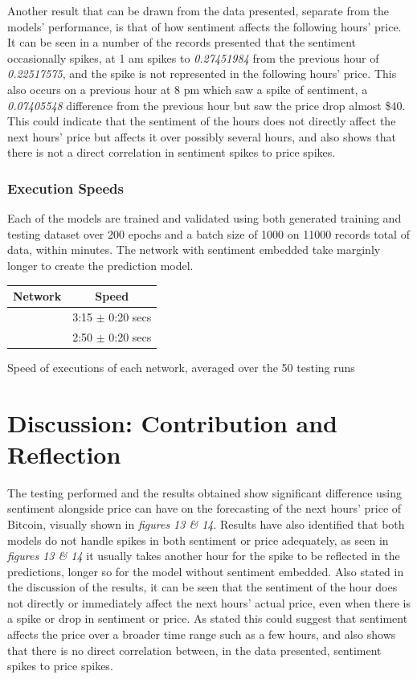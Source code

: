 \documentclass[oneside, 12pt]{article}
\begin{document}
	Another result that can be drawn from the data presented, separate from the models' performance, is that of how sentiment affects the following hours' price. It can be seen in a number of the records presented that the sentiment occasionally spikes, at 1 am spikes to \textit{0.27451984} from the previous hour of \textit{0.22517575}, and the spike is not represented in the following hours' price. This also occurs on a previous hour at 8 pm which saw a spike of sentiment, a \textit{0.07405548} difference from the previous hour but saw the price drop almost \$40. This could indicate that the sentiment of the hours does not directly affect the next hours' price but affects it over possibly several hours, and also shows that there is not a direct correlation in sentiment spikes to price spikes.
	
	\subsubsection{Execution Speeds}
	Each of the models are trained and validated using both generated training and testing dataset over 200 epochs and a batch size of 1000 on 11000 records total of data, within minutes. The network with sentiment embedded take marginly longer to create the prediction model.
	
	\begin{center}
		\begin{tabular}{c|c}
			\textbf{Network} & \textbf{Speed} \\
			\hline
			\multirow{1}{*}{} With Sentiment & 3:15 $\pm$ 0:20 secs\\
			\multirow{1}{*}{} Without Sentiment & 2:50 $\pm$ 0:20 secs\\
			
		\end{tabular}
		\newline
		
		Speed of executions of each network, averaged over the 50 testing runs
	\end{center}
	
	\newpage
	
	\section{Discussion: Contribution and Reflection}
	The testing performed and the results obtained show significant difference using sentiment alongside price can have on the forecasting of the next hours' price of Bitcoin, visually shown in \textit{figures 13 \& 14}. Results have also identified that both models do not handle spikes in both sentiment or price adequately, as seen in \textit{figures 13 \& 14} it usually takes another hour for the spike to be reflected in the predictions, longer so for the model without sentiment embedded. Also stated in the discussion of the results, it can be seen that the sentiment of the hour does not directly or immediately affect the next hours' actual price, even when there is a spike or drop in sentiment or price. As stated this could suggest that sentiment affects the price over a broader time range such as a few hours, and also shows that there is no direct correlation between, in the data presented, sentiment spikes to price spikes.
	
\end{document}
